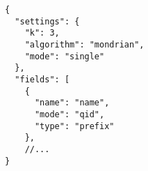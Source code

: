 \begin{lstlisting}[caption=Original input format,label=lst:original_format,float,floatplacement=H]
{
  "settings": {
    "k": 3,
    "algorithm": "mondrian",
    "mode": "single"
  },
  "fields": [
    {
      "name": "name",
      "mode": "qid",
      "type": "prefix"
    },
    //...
}
\end{lstlisting}
